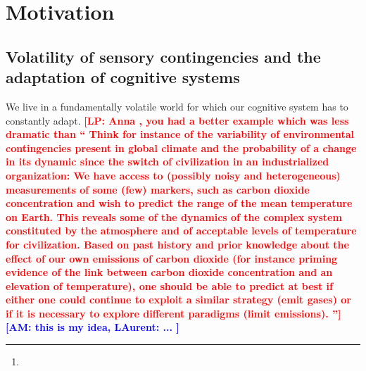 \documentclass[profile,final,english,draft]{article}%
\title{\Title}%
\author{\AuthorA,
\AuthorB,
\AuthorC\thanks{\Address} }
\newcommand{\LP}[1]{\textbf{\textcolor{red}{[LP: #1]}}}
\newcommand{\AM}[1]{\textbf{\textcolor{blue}{[AM: #1]}}}
\begin{document}
%
\maketitle%
\begin{abstract}
\Abstract
\end{abstract}
\section{Motivation}
\label{sec:intro}
\subsection{Volatility of sensory contingencies and
the adaptation of cognitive systems}
We live in a fundamentally volatile world for which
our cognitive system has to constantly adapt.
\LP{Anna , you had a better example which was less dramatic than ``
Think for instance of the variability of environmental contingencies
present in global climate and
the probability of a change in its dynamic
since the switch of civilization in an industrialized organization:
We have access to (possibly noisy and heterogeneous) measurements
of some (few) markers, such as carbon dioxide concentration and
wish to predict the range of the mean temperature on Earth.
This reveals some of the dynamics of
the complex system constituted by the atmosphere
and of acceptable levels of temperature for civilization.
Based on past history and prior knowledge about
the effect of our own emissions of carbon dioxide
(for instance priming evidence of the link between carbon dioxide
concentration and an elevation of temperature),
one should be able to predict at best if either
one could continue to exploit a similar strategy (emit gases)
or if it is necessary to explore different paradigms (limit emissions).
''}
\AM{this is my idea, LAurent:
...
}
\end{document}
